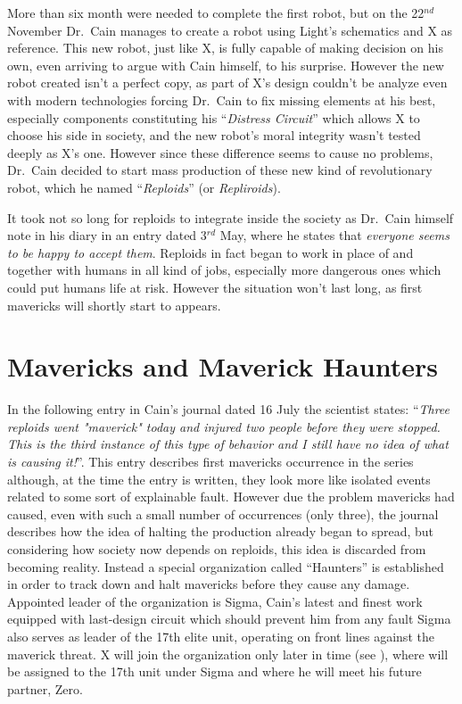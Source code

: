 More than six month were needed to complete the first robot, but on the 22$^{nd}$ November Dr.~Cain manages to create a robot using Light's schematics and X as reference. This new robot, just like X, is fully capable of making decision on his own, even arriving to argue with Cain himself, to his surprise. However the new robot created isn't a perfect copy, as part of X's design couldn't be analyze even with modern technologies forcing Dr.~Cain to fix missing elements at his best, especially components constituting his ``\emph{Distress Circuit}''\cite{book:RMZ_Complete_works} which allows X to choose his side in society, and the new robot's moral integrity wasn't tested deeply as X's one. However since these difference seems to cause no problems, Dr.~Cain decided to start mass production of these new kind of revolutionary robot, which he named ``\emph{Reploids}''  (or \emph{Repliroids}).

It took not so long for reploids to integrate inside the society as Dr.~Cain himself note in his diary in an entry dated 3$^{rd}$ May, where he states that \textit{everyone seems to be happy to accept them}. Reploids in fact began to work in place of and together with humans in all kind of jobs, especially more dangerous ones which could put humans life at risk. However the situation won't last long,  as first mavericks will shortly start to appears.

\section{Mavericks and Maverick Haunters}

In the following entry in Cain's journal dated 16 July the scientist states: ``\textit{Three reploids went "maverick" today and injured two people before they were stopped. This is the third instance of this type of behavior and I still have no idea of what is causing it!}''. This entry describes first mavericks occurrence in the series although, at the time the entry is written, they look more like isolated events related to some sort of explainable fault. However due the problem mavericks had caused, even with such a small number of occurrences (only three), the journal describes how the idea of halting the production already began to spread, but considering how society now depends on reploids, this idea is discarded from becoming reality. Instead a special organization called ``Haunters'' is  established in order to track down and halt mavericks before they cause any damage. Appointed leader of the organization is Sigma, Cain's latest and finest work equipped with last-design circuit which should prevent him from any fault Sigma also serves as leader of the 17th elite unit, operating on front lines against the maverick threat. X will join the organization only later in time (see \PtIIWarning), where will be assigned to the 17th unit under Sigma and where he will meet his future partner, Zero. 

